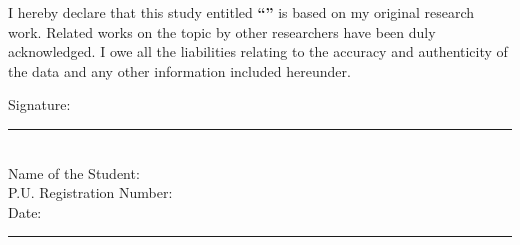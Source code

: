 \justifying
\noindent I hereby declare that this study entitled \textbf{``\PUThesisTitle''} is based on my original research work. Related works on the topic by other researchers have been duly acknowledged. I owe all the liabilities relating to the accuracy and authenticity of the data and any other information included hereunder.

\vspace{3\baselineskip}
\noindent Signature: \rule{5cm}{0.4pt}\\
Name of the Student: \PUStudentName\\
P.U. Registration Number: \PURegistrationNumber\\
Date: \rule{4cm}{0.4pt}
